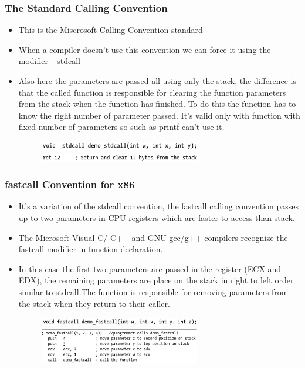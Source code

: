 \documentclass[]{beamer}
\begin{document}
		\begin{frame}
			\frametitle{The Standard Calling Convention}
			\begin{itemize}
				\item{This is the Miscrosoft Calling Convention standard}
				\item{When a compiler doesn't use this convention we can force it using the modifier \color{red}\_stdcall}
				\item{Also here the parameters are passed all using only the stack, the difference  is that the called function is responsible for clearing the function parameters from the stack when the function has finished. To do this the function has to know the right number of parameter passed. It's valid only with function with fixed number of parameters so such as printf can't use it.}
				\begin{figure}
					\includegraphics[width=7cm]{images/demo_stdcall.eps}\\
					\includegraphics[width=7cm]{images/clear_stack.eps}
				\end{figure}	
			\end{itemize}
		\end{frame}
		\begin{frame}
			\frametitle{fastcall Convention for x86}
			\begin{itemize}
				\item{It's a variation of the stdcall convention, the fastcall  calling convention passes up to two parameters in CPU registers which are faster to access than stack.}
				\item{The Microsoft Visual C/ C++ and GNU gcc/g++ compilers recognize the \color{red}fastcall\color{black} modifier in function declaration.}
				\item{In this case the first two parameters are passed in the register (ECX and EDX), the remaining parameters are place on the stack in right to left order similar to stdcall.The function is responsible for removing parameters from the stack when they return to their caller.}
				\begin{figure}
					\includegraphics[width=7cm]{images/demo_fastcall.eps}\\
					\includegraphics[width=7cm]{images/fastcall_place.eps}\\
				\end{figure}
			\end{itemize}
		\end{frame}
\end{document}
